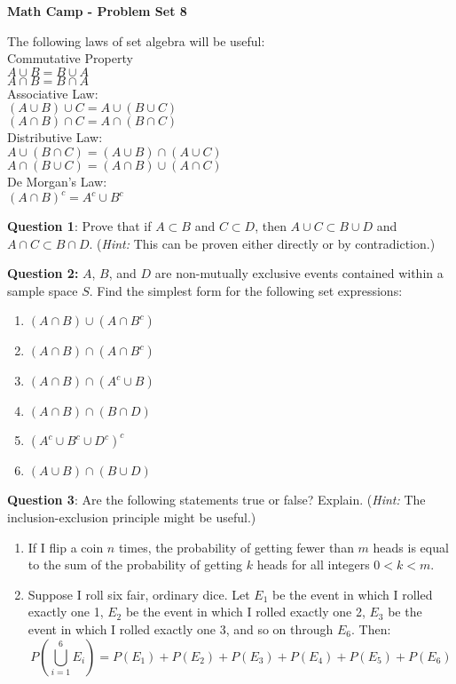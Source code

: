 \documentclass[12pt]{article}
\begin{document}
\centerline{\bf Math Camp - Problem Set 8}

\bigskip
The following laws of set algebra will be useful:\\

Commutative Property\\
$A\cup B = B \cup A$\\
$A\cap B = B \cap A$\\

Associative Law:\\
$(A\cup B) \cup C = A\cup (B \cup C)$\\
$(A\cap B) \cap C = A\cap (B \cap C)$\\


Distributive Law:\\
$A\cup (B\cap C) = (A\cup B) \cap (A \cup C)$\\
$A\cap (B\cup C) = (A\cap B) \cup (A \cap C)$\\

\bigskip
De Morgan's Law:\\
$(A \cap B)^c = A^c\cup B^c$\\


\bigskip

\noindent \textbf{Question 1}: Prove that if $A \subset B$ and $C \subset D$, then $A \cup C \subset B \cup D$ and $A \cap C \subset B \cap D$. (\textit{Hint:} This can be proven either directly or by contradiction.)



\bigskip

\noindent \textbf{Question 2:} $A$, $B$, and $D$ are non-mutually exclusive events contained within a sample space $S$. Find the simplest form for the following set expressions:
\begin{enumerate}
\item $(A \cap B) \cup (A \cap B^c)$
\item $(A \cap B) \cap (A \cap B^c)$
\item $(A \cap B) \cap (A^c \cup B)$
\item $(A \cap B) \cap (B \cap D)$
\item $(A^c \cup B^c \cup D^c)^c$
\item $(A \cup B) \cap (B \cup D)$
\end{enumerate}
\bigskip

\medskip

\noindent \textbf{Question 3}: Are the following statements true or false? Explain. (\textit{Hint:} The inclusion-exclusion principle might be useful.)
\begin{enumerate}
\item If I flip a coin $n$ times, the probability of getting fewer than $m$ heads is equal to the sum of the probability of getting $k$ heads for all integers $0 < k < m$.
\item Suppose I roll six fair, ordinary dice. Let $E_1$ be the event in which I rolled exactly one 1, $E_2$ be the event in which I rolled exactly one 2, $E_3$ be the event in which I rolled exactly one 3, and so on through $E_6$. Then: $$P\left( \bigcup_{i=1}^{6}E_{i} \right) = P(E_1)+P(E_2)+P(E_3)+P(E_4)+P(E_5)+P(E_6)$$
\end{enumerate}
\end{document}
